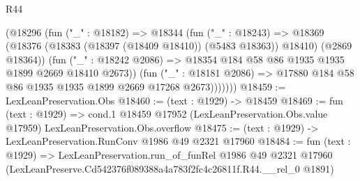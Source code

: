 \begin{lexlean}{R44}
\begin{coremodule}
              (@18296
                (fun ("_" : @18182) =>
                @18344
                  (fun ("_" : @18243) =>
                  @18369
                    (@18376 (@18383 (@18397 (@18409 @18410)) (@5483 @18363)) @18410)
                    (@2869 @18364))
                  (fun ("_" : @18242 @2086) =>
                  @18354 @184 @58 @86 @1935 @1935 @1899 @2669 @18410 @2673))
                (fun ("_" : @18181 @2086) =>
                @17880 @184 @58 @86 @1935 @1935 @1899 @2669 @17268 @2673)))))))
@18459 := LexLeanPreservation.Obs
@18460 := (text : @1929) -> @18459
@18469 := fun (text : @1929) =>
  cond.{1} @18459 @17952 (LexLeanPreservation.Obs.value @17959) LexLeanPreservation.Obs.overflow
@18475 := (text : @1929) -> LexLeanPreservation.RunConv @1986 @49 @2321 @17960
@18484 := fun (text : @1929) =>
  LexLeanPreservation.run_of_funRel
    @1986
    @49
    @2321
    @17960
    (LexLeanPreserve.Cd542376f089388a4a783f2fc4c26811f.R44.__rel_0 @1891)
\end{coremodule}
\end{lexlean}

